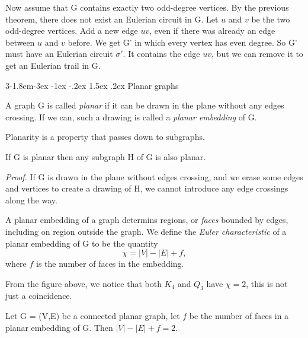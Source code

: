 \documentclass{tufte-handout}
\makeatletter
\renewcommand{\subsection}{\@startsection{subsection}%
    {3}{-1.8em}{-3ex \@plus -1ex \@minus -.2ex}%
    {1.5ex \@plus .2ex}
    {\hspace*{-5.5em}\fcolorbox{ltblue}{ltblue}{\parbox[c][1.0ex][b]{4em}{\phantom{space}}}
    \normalfont\large\itshape\color{ltblue}}}
\makeatother
\begin{document}
Now assume that G contains exactly two odd-degree vertices. By the previous theorem, there does not exist an
Eulerian circuit in G. Let \( u \) and \( v \) be the two odd-degree vertices. Add a new edge \( uv \), even if there was
already an edge between \( u \) and \( v \) before. We get G' in which every vertex has even degree.
So G' must have an Eulerian circuit \( \sigma' \). It contains the edge \( uv \), but we can remove it
to get an Eulerian trail in G. \qedsymbol

\subsection{Planar graphs}

A graph G is called \textit{planar} if it can be drawn in the plane without any edges crossing.
If we can, such a drawing is called a \textit{planar embedding} of G.

Planarity is a property that passes down to subgraphs.

\begin{Proposition}
    \label{prop:planar_subgraph}
    If G is planar then any subgraph H of G is also planar.
\end{Proposition}

\textit{Proof.} If G is drawn in the plane without edges crossing, and we erase some
edges and vertices to create a drawing of H, we cannot introduce any edge crossings along the way. \qedsymbol

A planar embedding of a graph determins regions, or \textit{faces} bounded by edges, 
including on region outside the graph.
We define the \textit{Euler characteristic} of a planar embedding of G to be the quantity
\[\chi = \left|V\right| - \left|E\right| + f,\]
where \( f \) is the number of faces in the embedding.

From the figure above, we notice that both \( K_4 \) and \( Q_3 \) have \(\chi = 2\), this is not just a coincidence.

\begin{Theorem}
    \label{thm:euler_formula}
    Let G = (V,E) be a connected planar graph, let \(f\) be the number of faces in a planar embedding of G.
    Then \( \left|V\right| - \left|E\right| + f = 2 \).
\end{Theorem}
\end{document}
